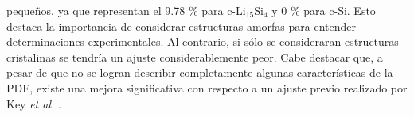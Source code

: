 pequeños, ya que representan el 9.78 \% para c-Li$_{15}$Si$_4$ y 0 \% para c-Si.
Esto destaca la importancia de considerar estructuras amorfas para entender 
determinaciones experimentales. Al contrario, si sólo se consideraran estructuras
cristalinas se tendría un ajuste considerablemente peor. Cabe destacar que, a 
pesar de que no se logran describir completamente algunas características de la 
PDF, existe una mejora significativa con respecto a un ajuste previo realizado por 
Key \textit{et al.} \cite{key2011}.
\begin{table}[h!]
    \centering
    \caption{Factor de peso de cada contribución (c-Si, c-Li$_{15}$Si$_4$, a-Si y 
    a-Li$_{15}$Si$_4$) a la función distribución radial de a pares $G(r)$ del 
    Si litiado (ver las Figuras \ref{fig:gofrs} y \ref{fig:pdfs} y la ecuación 
    \ref{eq:contributions}). El porcentaje que representa cada peso se agrega entre paréntesis.}
    \setlength\extrarowheight{2pt}
    \label{t:w-gofrs}
\end{table}
